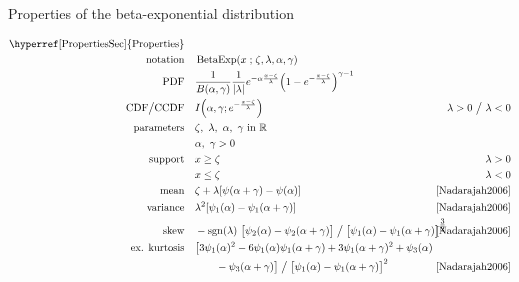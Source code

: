 

\begin{table*}[tp!]
\caption[Beta-exponential distribution -- Properties]{Properties of the beta-exponential distribution}
\begin{align*}
\text{\hyperref[PropertiesSec]{Properties}}  \quad& \\
\text{notation} \quad & \op{BetaExp}(x\given \pLoc,\pScale,\alpha, \gamma)  \checked
\\
\text{PDF}\quad &   \frac{1}{B(\alpha, \gamma)} \frac{1}{|\pScale|} e^{-\alpha \frac{x-\pLoc}{\pScale} }  \Left(1 - e^{-\frac{x-\pLoc}{\pScale}  }\Right)^{\gamma-1}  \checked
\\
\text{CDF} \big/ \text{CCDF} \quad  & I\Left(\alpha,\gamma; e^{-\frac{x-\pLoc}{\pScale}} \Right)\checked & \hspace{-2em}\pScale>0 \ \big/ \ \pScale<0
\\
\text{parameters}\quad &   \pLoc,\ \pScale,\ \alpha,\  \gamma \text{ in } \Real	\checked \\
& \alpha,\ \gamma >0	\checked
\\
\text{support} \quad &     x \geq \pLoc \checked&  \pScale > 0
\\
&   x\leq \pLoc  \checked&  \pScale < 0 
\\
\text{mean} \quad  &  \pLoc+ \pScale [\psi(\alpha+\gamma) -\psi(\alpha)  ]  \checked & \text{\cite{Nadarajah2006}}
\\
\text{variance} \quad  & \pScale^2 [\psi_1(\alpha)-\psi_1(\alpha+\gamma) ]  \checked & \text{\cite{Nadarajah2006}}
\\
\text{skew} \quad  &-\op{sgn}(\pScale)\ \bigl[{\psi_2(\alpha)-\psi_2(\alpha+\gamma)}\bigr] \bigm/ {  \bigl[\psi_1(\alpha)-\psi_1(\alpha+\gamma) \bigr]^{\tfrac{3}{2}} } \checked \hspace{-2em} &  \text{\cite{Nadarajah2006}}
\\
\text{ex. kurtosis} \quad  &
\bigl[3\psi_1(\alpha)^2- 6\psi_1(\alpha)\psi_1(\alpha+\gamma)+ 3\psi_1(\alpha+\gamma)^2+\psi_3(\alpha)
\hspace{-4em} \\ &\qquad -\psi_3(\alpha+\gamma)\bigr] \bigm/ \bigl[ \psi_1(\alpha)-\psi_1(\alpha+\gamma) \bigr]^2
\checked	
 				&  \text{\cite{Nadarajah2006}}
\\

\end{align*}
\end{table*}
